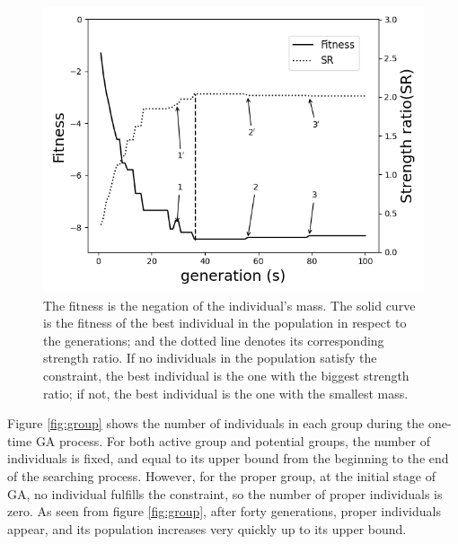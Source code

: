 \begin{figure}[!htb]
	\centering
	\includegraphics[width=\linewidth]{fig/fitness_strength_ratio.png}
	\caption{The fitness is the negation of the individual's mass. The solid
		curve is the fitness of the best individual in the population in respect
		to the generations; and the dotted line denotes its corresponding strength
		ratio. If no individuals in the population satisfy the constraint, the
		best individual is the one with the biggest strength ratio; if not, the
		best individual is the one with the smallest mass.
}
	\label{fig:sr}
\end{figure}



Figure \ref{fig:group} shows the number of individuals in each group during the
one-time GA process.  For both active group and potential groups, the number of
individuals is fixed, and equal to its upper bound from the beginning to the
end of the searching process. However, for the proper group, at the initial
stage of GA, no individual fulfills the constraint, so the number of proper
individuals is zero. As seen from figure \ref{fig:group}, after forty
generations, proper individuals appear, and its population increases very
quickly up to its upper bound.

